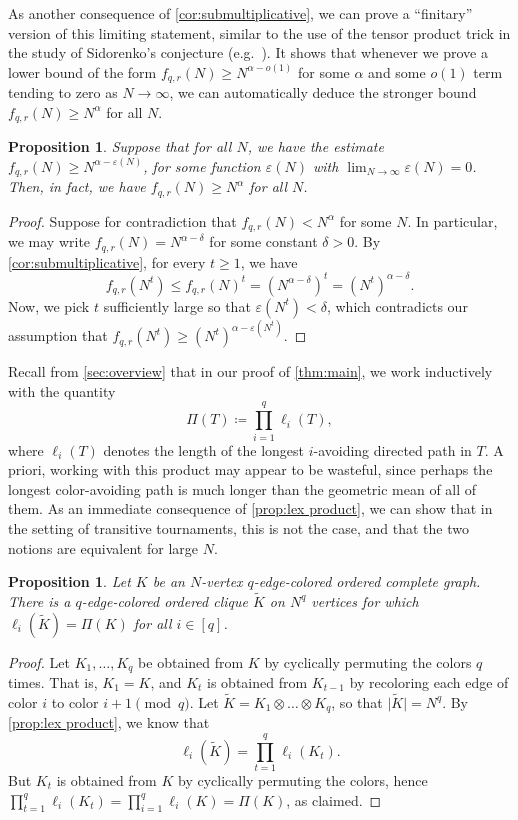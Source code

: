 \documentclass[11pt,reqno]{amsart}
\newtheorem{proposition}[theorem]{Proposition}
\theoremstyle{definition}
\newcommand\wt[1]{\widetilde{#1}}
\newcommand\ab[1]{\lvert#1\rvert}
\newcommand\1{\mathbf{1}}
\let\leq\leqslant
\let\geq\geqslant
\begin{document}
As another consequence of \cref{cor:submultiplicative}, we can prove a ``finitary'' version of this limiting statement, similar to the use of the tensor product trick in the study of Sidorenko's conjecture (e.g.\ \cite{MR1682960,MR2738996}). It shows that whenever we prove a lower bound of the form $f_{q,r}(N) \geq N^{\alpha-o(1)}$ for some $\alpha$ and some $o(1)$ term tending to zero as $N\to \infty$, we can automatically deduce the stronger bound $f_{q,r}(N) \geq N^\alpha$ for all $N$.
\begin{proposition}\label{prop:c=1}
    Suppose that for all $N$, we have the estimate $f_{q,r}(N) \geq N^{\alpha-\varepsilon(N)}$, for some function $\varepsilon(N)$ with $\lim_{N\to \infty}\varepsilon(N)=0$. Then, in fact, we have $f_{q,r}(N) \geq N^\alpha$ for all $N$.
\end{proposition}
\begin{proof}
    Suppose for contradiction that $f_{q,r}(N) < N^\alpha$ for some $N$. In particular, we may write $f_{q,r}(N)=N^{\alpha-\delta}$ for some constant $\delta>0$.  By \cref{cor:submultiplicative}, for every $t\geq 1$, we have
    \[
        f_{q,r}(N^t) \leq f_{q,r}(N)^t = (N^{\alpha-\delta})^t=(N^t)^{\alpha-\delta}.
    \]
    Now, we pick $t$ sufficiently large so that $\varepsilon(N^t)<\delta$, which contradicts our assumption that $f_{q,r}(N^t) \geq (N^t)^{\alpha-\varepsilon(N^t)}$. 
\end{proof}



Recall from \cref{sec:overview} that in our proof of \cref{thm:main}, we work inductively with the quantity
\[
    \Pi(T) \coloneqq \prod_{i=1}^q \ell_i(T),
\]
where $\ell_i(T)$ denotes the length of the longest $i$-avoiding directed path in $T$.
A priori, working with this product
may appear to be wasteful, since perhaps the longest color-avoiding path is much longer than the geometric mean of all of them. As an immediate consequence of \cref{prop:lex product}, we can show that in the setting of transitive tournaments, this is not the case, and that the two notions are equivalent for large $N$.
\begin{proposition}
    Let $K$ be an $N$-vertex $q$-edge-colored ordered complete graph. There is a $q$-edge-colored ordered clique $\wt K$ on $N^q$ vertices for which $\ell_i(\wt K)=\Pi(K)$ for all $i \in [q]$.
\end{proposition}
\begin{proof}
    Let $K_1,\dots,K_q$ be obtained from $K$ by cyclically permuting the colors $q$ times. That is, $K_1=K$, and $K_t$ is obtained from $K_{t-1}$ by recoloring each edge of color $i$ to color $i+1\pmod q$. Let $\wt K=K_1\otimes \dots \otimes K_q$, so that $\ab{\wt K}=N^q$. By \cref{prop:lex product}, we know that
    \[
        \ell_i(\wt K) = \prod_{t=1}^q \ell_i(K_t).
    \]
    But $K_t$ is obtained from $K$ by cyclically permuting the colors, hence $\prod_{t=1}^q \ell_i(K_t) = \prod_{i=1}^q \ell_i(K)=\Pi(K)$, as claimed. 
\end{proof}
\end{document}
